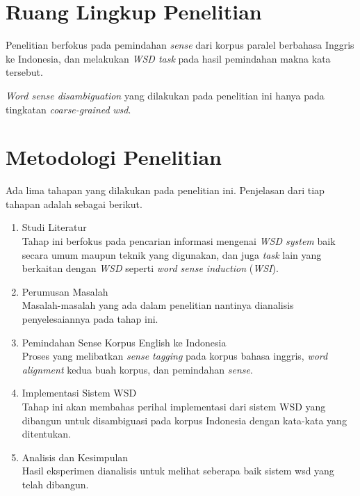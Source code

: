 \section{Ruang Lingkup Penelitian}
Penelitian berfokus pada pemindahan \textit{sense} dari korpus paralel berbahasa Inggris ke Indonesia, dan melakukan \textit{WSD task} pada hasil pemindahan makna kata tersebut.

\textit{Word sense disambiguation} yang dilakukan pada penelitian ini hanya pada tingkatan \textit{coarse-grained} \textit{wsd}.

\section{Metodologi Penelitian}
Ada lima tahapan yang dilakukan pada penelitian ini. Penjelasan dari tiap tahapan adalah sebagai berikut.
\begin{enumerate}
	\item Studi Literatur \\
	Tahap ini berfokus pada pencarian informasi mengenai \textit{WSD system} baik secara umum maupun teknik yang digunakan, dan juga \textit{task} lain yang berkaitan dengan \textit{WSD} seperti \textit{word sense induction} (\textit{WSI}).
	\item Perumusan Masalah \\
	Masalah-masalah yang ada dalam penelitian nantinya dianalisis penyelesaiannya pada tahap ini.
	\item Pemindahan Sense Korpus English ke Indonesia\\
	Proses yang melibatkan \textit{sense tagging} pada korpus bahasa inggris, \textit{word alignment} kedua buah korpus, dan pemindahan \textit{sense}.
	\item Implementasi Sistem WSD  \\
	Tahap ini akan membahas perihal implementasi dari sistem WSD yang dibangun untuk disambiguasi pada korpus Indonesia dengan kata-kata yang ditentukan.
	\item Analisis dan Kesimpulan \\
	Hasil eksperimen dianalisis untuk melihat seberapa baik sistem wsd yang telah dibangun.
\end{enumerate}



